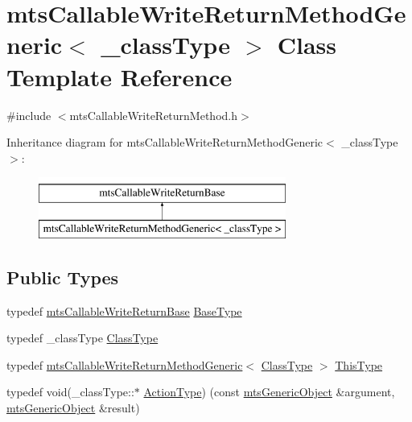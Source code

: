 \hypertarget{classmts_callable_write_return_method_generic}{}\section{mts\+Callable\+Write\+Return\+Method\+Generic$<$ \+\_\+class\+Type $>$ Class Template Reference}
\label{classmts_callable_write_return_method_generic}


{\ttfamily \#include $<$mts\+Callable\+Write\+Return\+Method.\+h$>$}

Inheritance diagram for mts\+Callable\+Write\+Return\+Method\+Generic$<$ \+\_\+class\+Type $>$\+:\begin{figure}[H]
\begin{center}
\leavevmode
\includegraphics[height=2.000000cm]{d9/dac/classmts_callable_write_return_method_generic}
\end{center}
\end{figure}
\subsection*{Public Types}
\begin{DoxyCompactItemize}
\item 
typedef \hyperlink{classmts_callable_write_return_base}{mts\+Callable\+Write\+Return\+Base} \hyperlink{classmts_callable_write_return_method_generic_a45af3bcddc1608f32979dd6770b341ad}{Base\+Type}
\item 
typedef \+\_\+class\+Type \hyperlink{classmts_callable_write_return_method_generic_a32ecf59575aa52541be0693586a2319d}{Class\+Type}
\item 
typedef \hyperlink{classmts_callable_write_return_method_generic}{mts\+Callable\+Write\+Return\+Method\+Generic}$<$ \hyperlink{classmts_callable_write_return_method_generic_a32ecf59575aa52541be0693586a2319d}{Class\+Type} $>$ \hyperlink{classmts_callable_write_return_method_generic_a628ed9547287aad4710fa55e37070f04}{This\+Type}
\item 
typedef void(\+\_\+class\+Type\+::$\ast$ \hyperlink{classmts_callable_write_return_method_generic_ad1c87482f62321654e496a4e1929d93c}{Action\+Type}) (const \hyperlink{classmts_generic_object}{mts\+Generic\+Object} \&argument, \hyperlink{classmts_generic_object}{mts\+Generic\+Object} \&result)
\end{DoxyCompactItemize}
